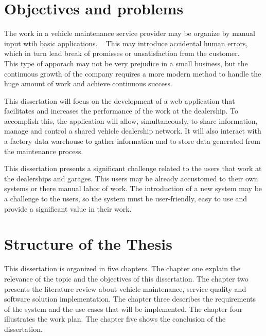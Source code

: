 \section{Objectives and problems}

The work in a vehicle maintenance service provider may be organize by manual input wtih basic applications. ~\cite{MAS_MOTORS} 
This may introduce accidental human errors, which in turn lead break of promisses or unsatisfaction from the customer. ~\cite{MAS_MOTORS} ~\cite{Setting_the_after_sale_process}
This type of apporach may not be very prejudice in a small business, but the continuous growth of the company requires a more modern method to handle the huge amount of work and achieve continuous success. ~\cite{MAS_MOTORS}

This dissertation will focus on the development of a web application that facilitates and increases the performance of the work at the dealership.
To accomplish this, the application will allow, simultaneously, to share information, manage and control a shared vehicle dealership network.
It will also interact with a factory data warehouse to gather information and to store data generated from the maintenance process. 

This dissertation presents a significant challenge related to the users that work at the dealerships and garages. 
This users may be already accustomed to their own systems or there manual labor of work.  
The introduction of a new system may be a challenge to the users, so the system must be user-friendly, easy to use and provide a significant value in their work.

\section{Structure of the Thesis}

This dissertation is organized in five chapters. The chapter one explain the relevance of the topic and the objectives of this dissertation.
The chapter two presents the literature review about vehicle maintenance, service quality and software solution implementation. 
The chapter three describes the requirements of the system and the use cases that will be implemented.
The chapter four illustrates the work plan.
The chapter five shows the conclusion of the dissertation. 

